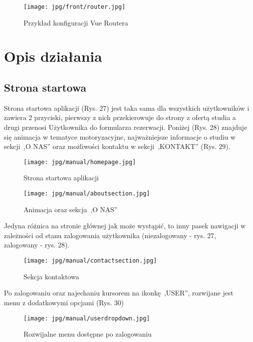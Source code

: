 \documentclass[11pt,a4paper]{article}
\begin{document}
\newpage
\begin{figure}[H]
    \centering
    \texttt{[image: jpg/front/router.jpg]}
    \caption{Przykład konfiguracji Vue Routera}
\end{figure}

\newpage
\section{Opis działania}

\subsection{Strona startowa}

Strona startowa aplikacji (Rys. 27) jest taka sama dla wszystkich użytkowników i zawiera 2 przyciski, pierwszy z nich przekierowuje do strony z ofertą studia a drugi przenosi Użytkownika do formularza rezerwacji. Poniżej (Rys. 28) znajduje się animacja w tematyce motoryzacyjne, najważniejsze informacje o studiu w sekcji \,,O NAS'' oraz możliwości kontaktu w sekcji \,,KONTAKT'' (Rys. 29). 

\begin{figure}[H]
    \centering
    \texttt{[image: jpg/manual/homepage.jpg]}
    \caption{Strona startowa aplikacji}
\end{figure}

\begin{figure}[H]
    \centering
    \texttt{[image: jpg/manual/aboutsection.jpg]}
    \caption{Animacja oraz sekcja \,,O NAS''}
\end{figure}

\noindent
Jedyna różnica na stronie głównej jak  może wystąpić, to inny pasek nawigacji w zależności od stanu zalogowania użytkownika (niezalogowany - rys. 27, zalogowany - rys. 28).

\begin{figure}[H]
    \centering
    \texttt{[image: jpg/manual/contactsection.jpg]}
    \caption{Sekcja kontaktowa}
\end{figure}

\noindent
Po zalogowaniu oraz najechaniu kursorem na ikonkę \,,USER'', rozwijane jest menu z dodatkowymi opcjami (Rys. 30)

\begin{figure}[H]
    \centering
    \texttt{[image: jpg/manual/userdropdown.jpg]}
    \caption{Rozwijalne menu dostępne po zalogowaniu}
\end{figure}
\end{document}
